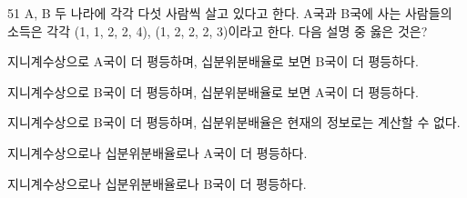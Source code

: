 \begin{question}{51}
A, B 두 나라에 각각 다섯 사람씩 살고 있다고 한다. A국과 B국에 사는 사람들의 소득은 각각 (1, 1, 2, 2, 4), (1, 2, 2, 2, 3)이라고 한다. 다음 설명 중 옳은 것은?
\begin{choices}
  \item 지니계수상으로 A국이 더 평등하며, 십분위분배율로 보면 B국이 더 평등하다.
  \item 지니계수상으로 B국이 더 평등하며, 십분위분배율로 보면 A국이 더 평등하다.
  \item 지니계수상으로 B국이 더 평등하며, 십분위분배율은 현재의 정보로는 계산할 수 없다.
  \item 지니계수상으로나 십분위분배율로나 A국이 더 평등하다.
  \item 지니계수상으로나 십분위분배율로나 B국이 더 평등하다.
\end{choices}
\end{question}
